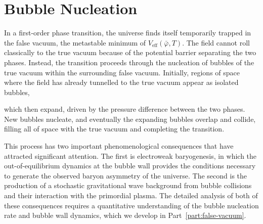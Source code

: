 
\section{Bubble Nucleation}

In a first-order phase transition, the universe finds itself temporarily
trapped in the false vacuum, the metastable minimum of
$V_{\text{eff}}(\bar\varphi, T)$. The field cannot roll classically to
the true vacuum because of the potential barrier separating the two
phases. Instead, the transition proceeds through the nucleation of
bubbles of the true vacuum within the surrounding false vacuum. Initially,
regions of space where the field has already tunnelled to the true vacuum
appear as isolated bubbles,


which then expand, driven by the pressure difference between the two
phases. New bubbles nucleate, and eventually the expanding bubbles
overlap and collide, filling all of space with the true vacuum and
completing the transition.

This process has two important phenomenological consequences that have
attracted significant attention. The first is electroweak baryogenesis,
in which the out-of-equilibrium dynamics at the bubble wall provides
the conditions necessary to generate the observed baryon asymmetry of
the universe. The second is the production of a stochastic gravitational
wave background from bubble collisions and their interaction with the
primordial plasma. The detailed analysis of both of these consequences
requires a quantitative understanding of the bubble nucleation rate and
bubble wall dynamics, which we develop in Part~\ref{part:false-vacuum}.

